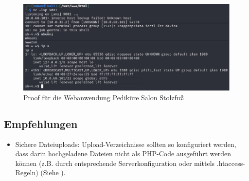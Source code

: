 \begin{figure}[!ht]
    \centering
    \includegraphics[width=\linewidth]{images/proofs/01_pedikuere_salon_proof.png}
    \caption{Proof für die Webanwendung Pediküre Salon Stolzfuß}
    \label{fig:01_pedikuere_salon_proof}
\end{figure}


\subsection*{Empfehlungen}
\begin{itemize}
    \item Sichere Dateiuploads: Upload-Verzeichnisse sollten so konfiguriert werden, dass darin hochgeladene Dateien nicht als PHP-Code ausgeführt werden können (z.B. durch entsprechende Serverkonfiguration oder mittels .htaccess-Regeln) (Siehe \cite{owaspFileUpload}).
\end{itemize}












